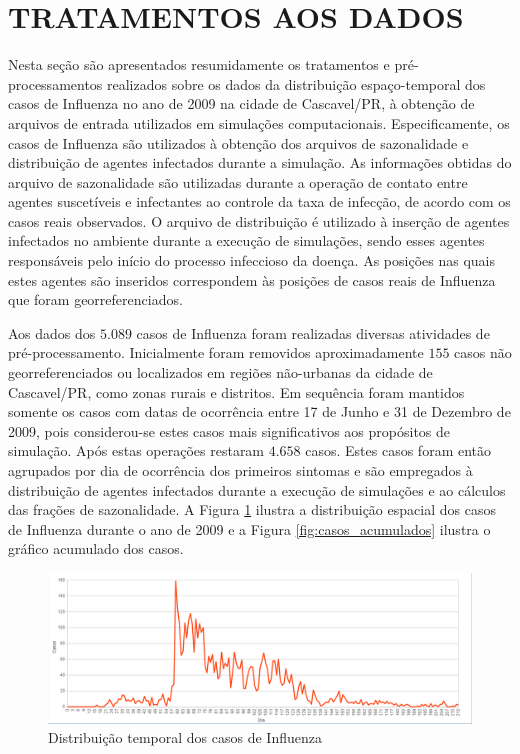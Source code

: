 \section{TRATAMENTOS AOS DADOS}
\label{sec:tratamentosDados}

Nesta seção são apresentados resumidamente os tratamentos e pré-processamentos realizados sobre os dados da distribuição espaço-temporal dos casos de Influenza no ano de 2009 na cidade de Cascavel/PR, à obtenção de arquivos de entrada utilizados em simulações computacionais. Especificamente, os casos de Influenza são utilizados à obtenção dos arquivos de sazonalidade e distribuição de agentes infectados durante a simulação. As informações obtidas do arquivo de sazonalidade são utilizadas durante a operação de contato entre agentes suscetíveis e infectantes ao controle da taxa de infecção, de acordo com os casos reais observados. O arquivo de distribuição é utilizado à inserção de agentes infectados no ambiente durante a execução de simulações, sendo esses agentes responsáveis pelo início do processo infeccioso da doença. As posições nas quais estes agentes são inseridos correspondem às posições de casos reais de Influenza que foram georreferenciados. 

Aos dados dos $5.089$ casos de Influenza foram realizadas diversas atividades de pré-processamento. Inicialmente foram removidos aproximadamente $155$ casos não georreferenciados ou localizados em regiões não-urbanas da cidade de Cascavel/PR, como zonas rurais e distritos. Em sequência foram mantidos somente os casos com datas de ocorrência entre 17 de Junho e 31 de Dezembro de 2009, pois considerou-se estes casos mais significativos aos propósitos de simulação. Após estas operações restaram $4.658$ casos. Estes casos foram então agrupados por dia de ocorrência dos primeiros sintomas e são empregados à distribuição de agentes infectados durante a execução de simulações e ao cálculos das frações de sazonalidade. A Figura \ref{fig:casos} ilustra a distribuição espacial dos casos de Influenza durante o ano de 2009 e a Figura \ref{fig:casos_acumulados} ilustra o gráfico acumulado dos casos.

\begin{figure}[H]
  \centering
  \includegraphics[width=1\textwidth]{Figuras/TratamentosDados/Casos.png}
  \caption{Distribuição temporal dos casos de Influenza}
  \label{fig:casos}
\end{figure} 

